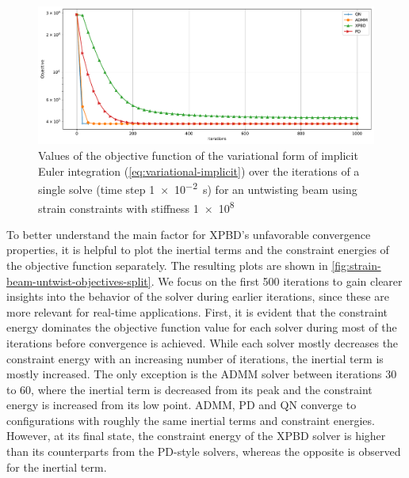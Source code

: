 \begin{figure}[h]
    \includegraphics[width=\textwidth]{figures/strain_beam_untwist_objectives.pdf}
    \caption{Values of the objective function of the variational form of implicit Euler integration (\cref{eq:variational-implicit}) over the iterations of a single solve (time step 
    \SI{1e-2}{\second}) for an untwisting beam using strain constraints with stiffness \num{1e8}}
    \label{fig:strain-beam-untwist-objectives}
\end{figure}


To better understand the main factor for XPBD's unfavorable convergence properties, it is helpful to plot the inertial terms and the constraint energies of the objective 
function separately. The resulting plots are shown in \autoref{fig:strain-beam-untwist-objectives-split}. 
We focus on the first 500 iterations to gain clearer insights into the behavior of the solver during earlier iterations, since these are more relevant for 
real-time applications. First, it is evident that the constraint energy dominates the objective function value for each solver during most of the iterations before 
convergence is achieved. While each solver mostly decreases the constraint energy with an increasing number of iterations, the inertial term is mostly increased. 
The only exception is the ADMM solver between iterations 30 to 60, where the inertial term is decreased from its peak and the constraint energy is increased from its 
low point. ADMM, PD and QN converge to configurations with roughly the same inertial terms and constraint energies. However, at its final state, the constraint 
energy of the XPBD solver is higher than its counterparts from the PD-style solvers, whereas the opposite is observed for the inertial term. 

